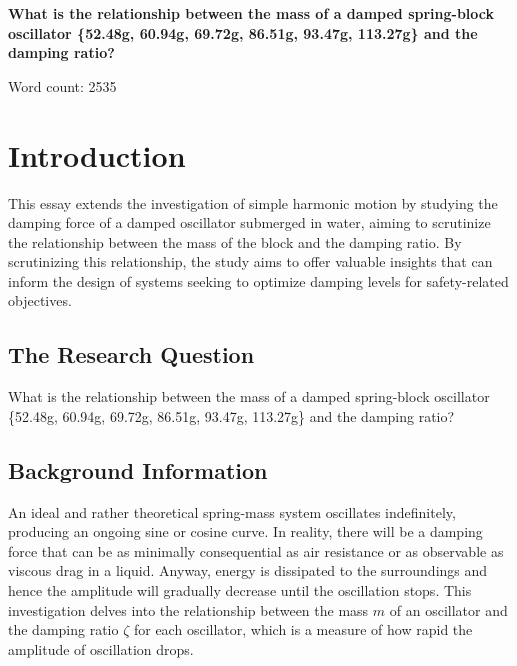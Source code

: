 \documentclass[a4paper,12pt]{article}
\begin{document}
\pagestyle{fancy}


\begin{titlepage}
  \begin{center}
    \vspace*{3cm}

    {\textbf{\Large{What is the relationship between the mass of a damped spring-block oscillator \{52.48g, 60.94g, 69.72g, 86.51g, 93.47g, 113.27g\} and the damping ratio?}}}



    \vspace{4cm}

    Word count: 2535

  \end{center}
\end{titlepage}
\pagebreak
\tableofcontents
\pagebreak

\clearpage
\setcounter{page}{1}

\section{Introduction}
This essay extends the investigation of simple harmonic motion by studying the damping force of a damped oscillator submerged in water, aiming to scrutinize the relationship between the mass of the block and the damping ratio. By scrutinizing this relationship, the study aims to offer valuable insights that can inform the design of systems seeking to optimize damping levels for safety-related objectives.


\subsection{The Research Question}
What is the relationship between the mass of a damped spring-block oscillator \{52.48g, 60.94g, 69.72g, 86.51g, 93.47g, 113.27g\} and the damping ratio?

\subsection{Background Information}
An ideal and rather theoretical spring-mass system oscillates indefinitely, producing an ongoing sine or cosine curve. In reality, there will be a damping force that can be as minimally consequential as air resistance or as observable as viscous drag in a liquid. Anyway, energy is dissipated to the surroundings and hence the amplitude will gradually decrease until the oscillation stops. This investigation delves into the relationship between the mass $m$ of an oscillator and the damping ratio $\zeta$ for each oscillator, which is a measure of how rapid the amplitude of oscillation drops.
\end{document}
